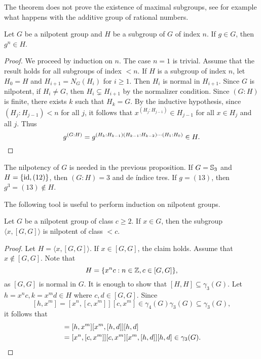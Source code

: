 The theorem does not prove the existence of maximal subgroups, see for example what happens with
the additive group of rational numbers. 

\begin{proposition}
	\label{pro:g^n}
	Let $G$ be a nilpotent group and $H$ be a subgroup of $G$ of index $n$. If 
	$g\in G$, then $g^n\in H$.
\end{proposition}

\begin{proof}
	We proceed by induction on $n$. The case $n=1$ is trivial. Assume that the result holds 
	for all subgroups of index $<n$. If $H$ is a subgroup of index $n$, let 
	$H_0=H$ and $H_{i+1}=N_G(H_i)$ for $i\geq1$. Then $H_{i}$ is normal in 
	$H_{i+1}$. Since $G$ is nilpotent, if $H_i\ne G$, then 
    $H_i\subsetneq H_{i+1}$ by the normalizer condition. Since  
	$(G:H)$ is finite, there exists $k$ such that $H_k=G$. By the inductive hypothesis, since
	$(H_j:H_{j-1})<n$ for all $j$, it follows that 
	$x^{(H_j:H_{j-1})}\in H_{j-1}$ for all $x\in H_j$ and all $j$. Thus   
	\[
		g^{(G:H)}=g^{(H_k:H_{k-1})(H_{k-1}:H_{k-2})\cdots (H_1:H_0)}\in H.\qedhere 
	\]
\end{proof}

\begin{example}
The nilpotency of $G$ is needed in the previous proposition. 
If $G=\mathbb{S}_3$ and $H=\{\operatorname{id},(12)\}$, then $(G:H)=3$ and  de índice tres. If 
$g=(13)$, then $g^{3}=(13)\not\in H$. 	
\end{example}

The following tool is useful to perform induction 
on nilpotent groups.  

\begin{lemma}
	\label{lem:a[GG]}
	Let $G$ be a nilpotent group of class $c\geq2$. If $x\in G$, then the subgroup 
	$\langle x,[G,G]\rangle$ is nilpotent of class $<c$.
\end{lemma}

\begin{proof}
	Let $H=\langle x,[G,G]\rangle$.  If $x\in [G,G]$, the claim holds. 
	Assume that $x\not\in [G,G]$. Note that  
	\[
		H=\{x^nc:n\in\mathbb{Z},c\in [G,G]\},
	\]
	as $[G,G]$ is normal in $G$. It is enough to show that   
	$[H,H]\subseteq\gamma_3(G)$. Let $h=x^nc,k=x^md\in H$
	where $c,d\in [G,G]$. 
	Since 
	\[
	[h,x^m]=[x^n,[c,x^m]][c,x^m]\in\gamma_4(G)\gamma_3(G)\subseteq\gamma_3(G),
	\]
	it follows that  
	\begin{align*}
		[h,k]&=[h,x^m][x^m,[h,d]][h,d]\\
			&=[x^n,[c,x^m]][c,x^m][x^m,[h,d]][h,d]\in\gamma_3(G).\qedhere
	\end{align*}
\end{proof}

